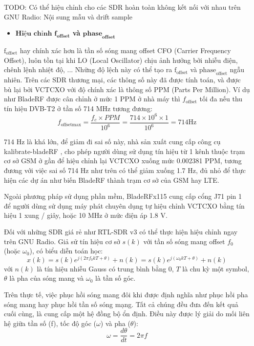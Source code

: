 {TODO: Có thể hiệu chỉnh cho các SDR hoàn toàn không kết nối với nhau trên GNU Radio: Nội sung mẫu và drift sample

\begin{itemize}
	\item \textbf{$\textbf{Hiệu chỉnh } \textbf{f}_{\textbf{offset}}$ và $\textbf{phase}_\textbf{offset}$}
\end{itemize} 

$\textrm{f}_{\textrm{offset}}$ hay chính xác hơn là tần số sóng mang offset CFO (Carrier Frequency Offset), luôn tồn tại khi LO (Local Oscillator) chịu ảnh hưởng bởi nhiễu điện, chênh lệnh nhiệt độ, ... Những độ lệch này có thể tạo ra $\textrm{f}_{\textrm{offset}}$ và $\textrm{phase}_\textrm{offset}$ ngẫu nhiên. Trên các SDR thương mại, các thông số này đã được tính toán, và được bù lại bởi VCTCXO với độ chính xác là thông số PPM (Parts Per Million). Ví dụ như BladeRF được cân chỉnh ở mức 1 PPM ở nhà máy thì $f_{\textrm{offset}}$ tối đa nếu thu tín hiệu DVB-T2 ở tần số 714 MHz tương đương:
\begin{equation}
f_{\mathrm{offset  max}} = \frac{f_c \times PPM}{10^6} = \frac{714 \times 10^6 \times 1}{10^6} = 714 \textrm{Hz}
\end{equation}

714 Hz là khá lớn, để giảm đi sai số này, nhà sản xuất cung cấp công cụ kalibrate-bladeRF \cite{kali}, cho phép người dùng sử dụng tín hiệu từ 1 kênh thuộc trạm cơ sở GSM ở gần để hiệu chỉnh lại VCTCXO xuống mức 0.002381 PPM, tương đương với việc sai số 714 Hz như trên có thể giảm xuống 1.7 Hz, đủ nhỏ để thực hiện các dự án như biến BladeRF thành trạm cơ sở của GSM hay LTE.

Ngoài phương pháp sử dụng phần mềm, BladeRFx115 cung cấp cổng J71 pin 1 để người dùng sử dụng máy phát chuyên dụng tự hiệu chỉnh VCTCXO bằng tín hiệu 1 xung / giây, hoặc 10 MHz ở mức điện áp 1.8 V.

Đối với những SDR giá rẻ như RTL-SDR v3 có thể thực hiện hiệu chỉnh ngay trên GNU Radio. Giả sử tín hiệu cơ sở $s(k)$ với tần số sóng mang offset $f_{0}$ (hoặc $\omega_{0}$), có biểu diễn toán học:
\begin{equation}
	x(k) = s(k)e^{j(2\pi f_{0} k T + \theta)} + n(k) = s(k)e^{j(\omega_0 k T + \theta)} + n(k)
\end{equation}
với $n(k)$ là tín hiệu nhiễu Gauss có trung bình bằng 0, $T$ là chu kỳ một symbol, $\theta$ là pha của sóng mang và $\omega_0$ là tần số góc.

Trên thực tế, việc phục hồi sóng mang đôi khi được định nghĩa như phục hồi pha sóng mang hay phục hồi tần số sóng mạng. Tất cả chúng đều đưa đến kết quả cuối cùng, là cung cấp một hệ đồng bộ ổn định. Điều này được lý giải do mối liên hệ giữa tần số (f), tốc độ góc ($\omega$) và pha ($\theta$):
\begin{equation}
	\omega = \frac{d\theta}{dt} = 2 \pi f
\end{equation}

}
